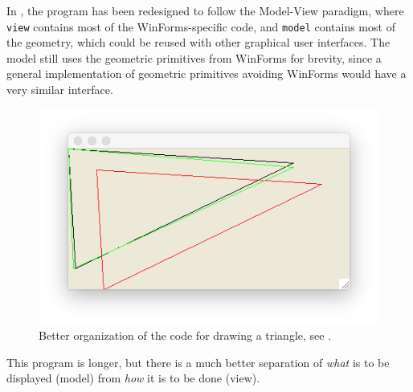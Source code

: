 \documentclass[fsharpNotes.tex]{subfiles}
\begin{document}
In , the program has been redesigned to follow the Model-View paradigm, where \lstinline{view} contains most of the WinForms-specific code, and \lstinline{model} contains most of the geometry, which could be reused with other graphical user interfaces. The model still uses the geometric primitives from WinForms for brevity, since a general implementation of geometric primitives avoiding WinForms would have a very similar interface.
%
%
\begin{figure}
  \centering
  \includegraphics[scale=0.3]{triangleOrganized}
  \caption{Better organization of the code for drawing a triangle, see .}
  \label{fig:triangleOrganized}
\end{figure}
This program is longer, but there is a much better separation of {\em what} is to be displayed (model) from {\em how} it is to be done (view).
\end{document}
